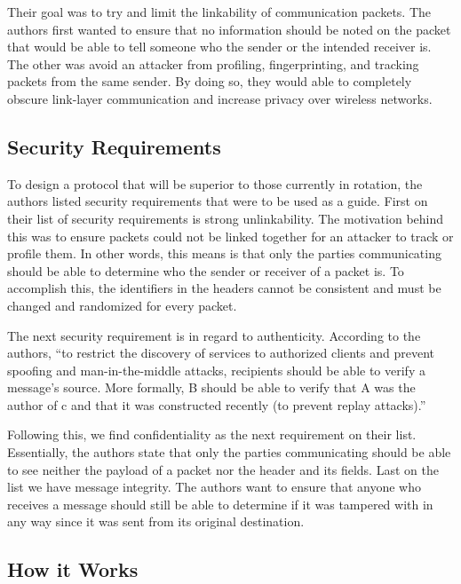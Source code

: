 \smallskip

Their goal was to try and limit the linkability of communication packets. The authors first wanted to ensure that no information should be noted on the packet that would be able to tell someone who the sender or the intended receiver is. The other was avoid an attacker from profiling, fingerprinting, and tracking packets from the same sender. By doing so, they would able to completely obscure link-layer communication and increase privacy over wireless networks.

\subsection {Security Requirements}
\smallskip

To design a protocol that will be superior to those currently in rotation, the authors listed security requirements that were to be used as a guide. 
First on their list of security requirements is strong unlinkability. The motivation behind this was to ensure packets could not be linked together for an attacker to track or profile them. In other words, this means is that only the parties communicating should be able to determine who the sender or receiver of a packet is. To accomplish this, the identifiers in the headers cannot be consistent and must be changed and randomized for every packet.

\smallskip

The next security requirement is in regard to authenticity. According to the authors, “to restrict the discovery of services to authorized clients and prevent spoofing and man-in-the-middle attacks, recipients should be able to verify a message’s source. More formally, B should be able to verify that A was the author of c and that it was constructed recently (to prevent replay attacks).” \cite {greenstein2008improving}

\smallskip

Following this, we find confidentiality as the next requirement on their list. Essentially, the authors state that only the parties communicating should be able to see neither the payload of a packet nor the header and its fields. Last on the list we have message integrity. The authors want to ensure that anyone who receives a message should still be able to determine if it was tampered with in any way since it was sent from its original destination. 

\subsection {How it Works}
\smallskip

